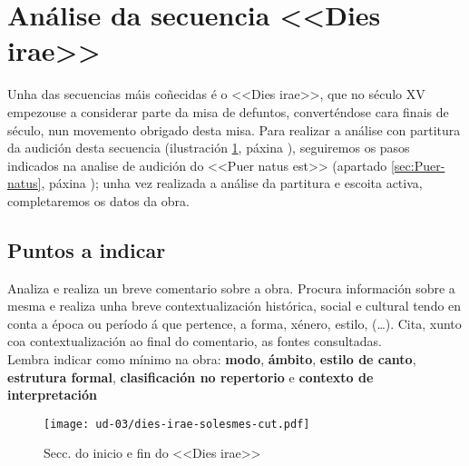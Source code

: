 %
%
\section{Análise da secuencia <<Dies irae>>} \label{sec:Dies-irae}
%
\noindent
Unha das secuencias máis coñecidas é o <<Dies irae>>, que no século 
{\small XV} empezouse a considerar parte da misa de defuntos, converténdose 
cara finais de século, nun movemento obrigado desta misa.
Para realizar a análise con partitura da audición desta secuencia 
(ilustración \ref{fig:dies-irae}, páxina \pageref{fig:dies-irae}), seguiremos 
os pasos indicados na analise de audición do <<Puer natus est>>  
(apartado \ref{sec:Puer-natus}, páxina \pageref{sec:Puer-natus}); unha vez 
realizada a análise da partitura e escoita activa, completaremos os datos da 
obra.
%
\subsection*{Puntos a indicar} \label{subsec:puntos}
%
\noindent
Analiza e realiza un breve comentario sobre a obra. Procura información sobre a 
mesma e realiza unha breve contextualización histórica, social e cultural tendo 
en conta a época ou período á que pertence, a forma, xénero, estilo, (\ldots). 
Cita, xunto coa contextualización ao final do comentario, as 
fontes consultadas. \\
%
\noindent
Lembra indicar como mínimo na obra: \textbf{modo}, \textbf{ámbito}, 
\textbf{estilo de canto}, \textbf{estrutura formal}, \textbf{clasificación no 
repertorio} e \textbf{contexto de interpretación}
%
\vspace*{0.5cm}
%

\begin{ejercicio}



\vspace*{13.5cm}
\end{ejercicio}

%
\begin{figure}[h]
    \centering
    \texttt{[image: ud-03/dies-irae-solesmes-cut.pdf]}
    \caption{Secc. do inicio e fin do <<Dies irae>>}
    \label{fig:dies-irae}
\end{figure}
%
